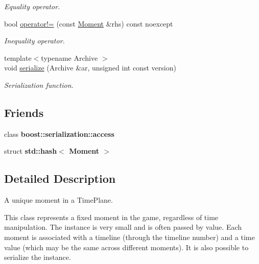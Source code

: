 \begin{DoxyCompactItemize}
\begin{DoxyCompactList}\small\item\em Equality operator. \end{DoxyCompactList}\item 
bool \hyperlink{classtimeplane_1_1_moment_a2e50bd80270c77f8d1b9fdbc586efc7c}{operator!=} (const \hyperlink{classtimeplane_1_1_moment}{Moment} \&rhs) const noexcept
\begin{DoxyCompactList}\small\item\em Inequality operator. \end{DoxyCompactList}\item 
{\footnotesize template$<$typename Archive $>$ }\\void \hyperlink{classtimeplane_1_1_moment_ac7870eb30ed18b8ea85bf7584632cd11}{serialize} (Archive \&ar, unsigned int const version)
\begin{DoxyCompactList}\small\item\em Serialization function. \end{DoxyCompactList}\end{DoxyCompactItemize}
\subsection*{Friends}
\begin{DoxyCompactItemize}
\item 
\mbox{\label{classtimeplane_1_1_moment_ac98d07dd8f7b70e16ccb9a01abf56b9c}} 
class {\bfseries boost\+::serialization\+::access}
\item 
\mbox{\label{classtimeplane_1_1_moment_a6000ec770baa14dc72ef269915ff4f6d}} 
struct {\bfseries std\+::hash$<$ Moment $>$}
\end{DoxyCompactItemize}


\subsection{Detailed Description}
A unique moment in a {\ttfamily Time\+Plane}. 

This class represents a fixed moment in the game, regardless of time manipulation. The instance is very small and is often passed by value. Each moment is associated with a timeline (through the timeline number) and a time value (which may be the same across different moments). It is also possible to serialize the instance. 

